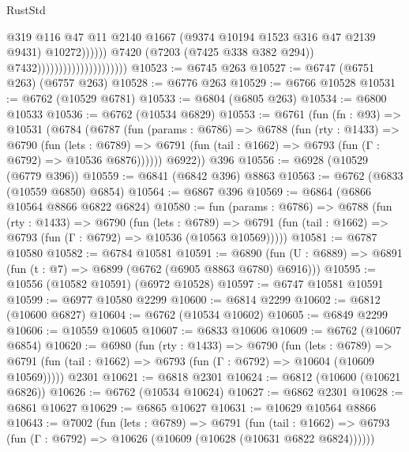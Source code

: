 \begin{lexlean}{RustStd}
\begin{coremodule}
                                                          @319
                                                          @116
                                                          @47
                                                          @11
                                                          @2140
                                                          @1667
                                                          (@9374 @10194 @1523 @316 @47 @2139 @9431)
                                                          @10272))))))
                                              @7420
                                              (@7203 (@7425 @338 @382 @294))
                                              @7432)))))))))))))))))))))
@10523 := @6745 @263
@10527 := @6747 (@6751 @263) (@6757 @263)
@10528 := @6776 @263
@10529 := @6766 @10528
@10531 := @6762 (@10529 @6781)
@10533 := @6804 (@6805 @263)
@10534 := @6800 @10533
@10536 := @6762 (@10534 @6829)
@10553 := @6761
    (fun (fn : @93) =>
    @10531
      (@6784
        (@6787
          (fun (params : @6786) =>
          @6788
            (fun (rty : @1433) =>
            @6790
              (fun (lets : @6789) =>
              @6791 (fun (tail : @1662) => @6793 (fun (Γ : @6792) => @10536 @6876))))))
        @6922))
    @396
@10556 := @6928 (@10529 (@6779 @396))
@10559 := @6841 (@6842 @396) @8863
@10563 := @6762 (@6833 (@10559 @6850) @6854)
@10564 := @6867 @396
@10569 := @6864 (@6866 @10564 @8866 @6822 @6824)
@10580 := fun (params : @6786) =>
  @6788
    (fun (rty : @1433) =>
    @6790
      (fun (lets : @6789) =>
      @6791 (fun (tail : @1662) => @6793 (fun (Γ : @6792) => @10536 (@10563 @10569)))))
@10581 := @6787 @10580
@10582 := @6784 @10581
@10591 := @6890 (fun (U : @6889) => @6891 (fun (t : @7) => @6899 (@6762 (@6905 @8863 @6780) @6916)))
@10595 := @10556 (@10582 @10591) (@6972 @10528)
@10597 := @6747 @10581 @10591
@10599 := @6977 @10580 @2299
@10600 := @6814 @2299
@10602 := @6812 (@10600 @6827)
@10604 := @6762 (@10534 @10602)
@10605 := @6849 @2299
@10606 := @10559 @10605
@10607 := @6833 @10606
@10609 := @6762 (@10607 @6854)
@10620 := @6980
    (fun (rty : @1433) =>
    @6790
      (fun (lets : @6789) =>
      @6791 (fun (tail : @1662) => @6793 (fun (Γ : @6792) => @10604 (@10609 @10569)))))
    @2301
@10621 := @6818 @2301
@10624 := @6812 (@10600 (@10621 @6826))
@10626 := @6762 (@10534 @10624)
@10627 := @6862 @2301
@10628 := @6861 @10627
@10629 := @6865 @10627
@10631 := @10629 @10564 @8866
@10643 := @7002
    (fun (lets : @6789) =>
    @6791
      (fun (tail : @1662) =>
      @6793 (fun (Γ : @6792) => @10626 (@10609 (@10628 (@10631 @6822 @6824))))))

\end{coremodule}
\end{lexlean}
